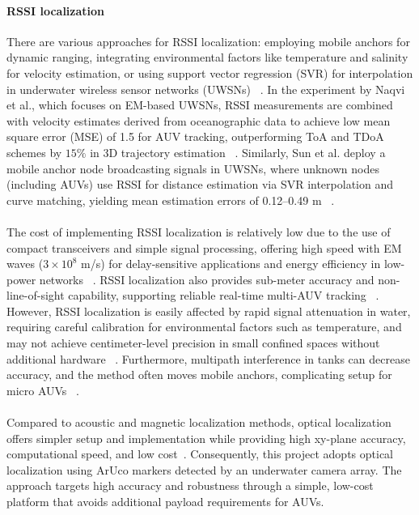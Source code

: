 \documentclass[11pt]{article}
\begin{document}
        \paragraph{RSSI localization}
        There are various approaches for RSSI localization: employing mobile anchors for dynamic ranging, integrating environmental factors like temperature and salinity for velocity estimation, or using support vector regression (SVR) for interpolation in underwater wireless sensor networks (UWSNs) ~\cite{naqvi2025rssi,sun2019mobile}. In the experiment by Naqvi et al., which focuses on EM-based UWSNs, RSSI measurements are combined with velocity estimates derived from oceanographic data to achieve low mean square error (MSE) of 1.5 for AUV tracking, outperforming ToA and TDoA schemes by $15\%$ in 3D trajectory estimation ~\cite{naqvi2025rssi}. Similarly, Sun et al. deploy a mobile anchor node broadcasting signals in UWSNs, where unknown nodes (including AUVs) use RSSI for distance estimation via SVR interpolation and curve matching, yielding mean estimation errors of 0.12–0.49 m ~\cite{sun2019mobile}.\\\\
        The cost of implementing RSSI localization is relatively low due to the use of compact transceivers and simple signal processing, offering high speed with EM waves ($3×10^8$ m/s) for delay-sensitive applications and energy efficiency in low-power networks ~\cite{naqvi2025rssi,sun2019mobile}. RSSI localization also provides sub-meter accuracy and non-line-of-sight capability, supporting reliable real-time multi-AUV tracking ~\cite{sun2019mobile}. However, RSSI localization is easily affected by rapid signal attenuation in water, requiring careful calibration for environmental factors such as temperature, and may not achieve centimeter-level precision in small confined spaces without additional hardware ~\cite{naqvi2025rssi,sun2019mobile}. Furthermore, multipath interference in tanks can decrease accuracy, and the method often moves mobile anchors, complicating setup for micro AUVs ~\cite{naqvi2025rssi}.\\\\
        Compared to acoustic and magnetic localization methods, optical localization offers simpler setup and implementation while providing high xy-plane accuracy, computational speed, and low cost~\cite{cai_development_2024}. Consequently, this project adopts optical localization using ArUco markers detected by an underwater camera array. The approach targets high accuracy and robustness through a simple, low-cost platform that avoids additional payload requirements for AUVs.
        
\end{document}
